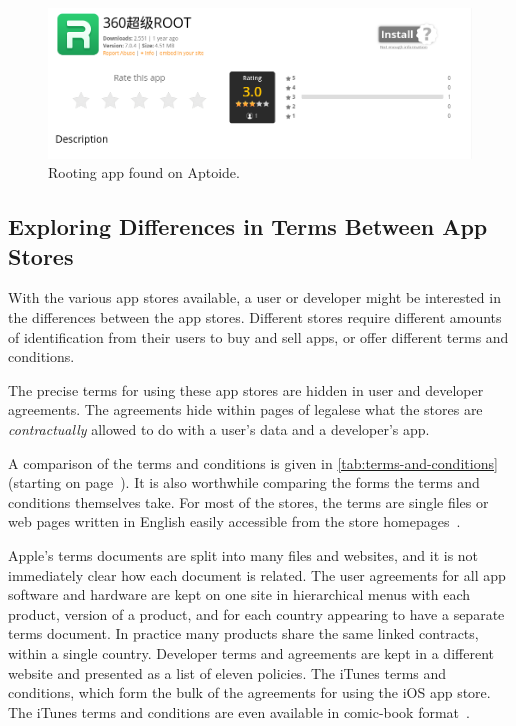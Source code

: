 \documentclass[thesis.tex]{subfiles}
\begin{document}
\begin{figure}
  \centering
  \includegraphics[width=0.8\linewidth]{figures/aptoide-root.png}
  \caption{Rooting app found on Aptoide.}
  \label{fig:aptoide-root}
\end{figure}


\subsection{Exploring Differences in Terms Between App Stores}

With the various app stores available, a user or developer might be
interested in the differences between the app stores.  Different stores require
different amounts of identification from their users to buy and sell
apps, or offer different terms and conditions.

The precise terms for using these app stores are hidden in user and
developer agreements.  The agreements hide within pages of legalese what the
stores are \emph{contractually} allowed to do with a user's data and a
developer's app.

A comparison of the terms and conditions is given in
\autoref{tab:terms-and-conditions} (starting on page~\pageref{tab:top-of-byod}). It is also worthwhile comparing the forms
the terms and conditions themselves take. For most of the stores, the terms are
single files or web pages written in English easily accessible from the store
homepages~\cite{yandex_yandex.store_nodate,aptoide_aptoide_nodate,google_google_nodate,amazon_amazon.co.uk_nodate}.

Apple's terms documents are split into many files and websites, and it is not
immediately clear how each document is related. The user agreements for all app
software and hardware are kept on one site in hierarchical menus with each
product, version of a product, and for each country appearing to have a separate
terms document. In practice many products share the same linked contracts,
within a single country. Developer terms and agreements are kept in a different
website and presented as a list of eleven policies. The iTunes terms and
conditions, which form the bulk of the agreements for using the iOS app store.
The iTunes terms and conditions are even available in comic-book format~\cite{r._sikoryak_terms_2017}.
\end{document}
